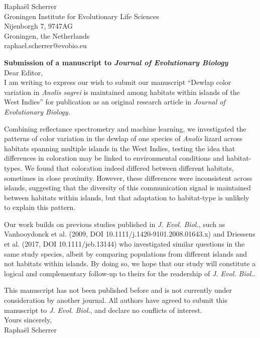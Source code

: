 \documentclass[12pt]{letter}
\begin{document}
	
	\thispagestyle{empty}
	
	\begin{flushright}
		Rapha\"{e}l Scherrer\\
		Groningen Institute for Evolutionary Life Sciences\\
		Nijenborgh 7, 9747AG\\
		Groningen, the Netherlands\\
		raphael.scherrer@evobio.eu\\[5ex]
	\end{flushright}
	
	\textbf{Submission of a manuscript to \textit{Journal of Evolutionary Biology}}\\
	
	Dear Editor,\\
	
	I am writing to express our wish to submit our manuscript ``Dewlap color variation in \textit{Anolis sagrei} is maintained among habitats within islands of the West Indies'' for publication as an original research article in \textit{Journal of Evolutionary Biology}.
	
	Combining reflectance spectrometry and machine learning, we investigated the patterns of color variation in the dewlap of one species of \textit{Anolis} lizard across habitats spanning multiple islands in the West Indies, testing the idea that differences in coloration may be linked to environmental conditions and habitat-types. We found that coloration indeed differed between different habitats, sometimes in close proximity. However, these differences were inconsistent across islands, suggesting that the diversity of this communication signal is maintained between habitats within islands, but that adaptation to habitat-type is unlikely to explain this pattern.
	
	Our work builds on previous studies published in \textit{J. Evol. Biol.}, such as Vanhooydonck et al. (2009, DOI 10.1111/j.1420-9101.2008.01643.x) and Driessens et al. (2017, DOI 10.1111/jeb.13144) who investigated similar questions in the same study species, albeit by comparing populations from different islands and not habitats within islands. By doing so, we hope that our study will constitute a logical and complementary follow-up to theirs for the readership of \textit{J. Evol. Biol.}.
	
	This manuscript has not been published before and is not currently under consideration by another journal. All authors have agreed to submit this manuscript to \textit{J. Evol. Biol.}, and declare no conflicts of interest.\\
	
	Yours sincerely,\\
	
	Rapha\"{e}l Scherrer
	
\end{document}
